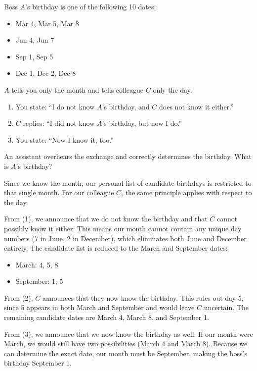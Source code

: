 \newpage

\begin{problem}
Boss $A$'s birthday is one of the following 10 dates:
\begin{itemize}
    \item Mar 4, Mar 5, Mar 8
    \item Jun 4, Jun 7
    \item Sep 1, Sep 5
    \item Dec 1, Dec 2, Dec 8
\end{itemize}
$A$ tells you only the month and tells colleague $C$ only the day.
\begin{enumerate}
    \item You state: ``I do not know $A$'s birthday, and $C$ does not know it either.''
    \item $C$ replies: ``I did not know $A$'s birthday, but now I do.''
    \item You state: ``Now I know it, too.''
\end{enumerate}
An assistant overhears the exchange and correctly determines the birthday. What is $A$'s birthday?
\end{problem}

\begin{solution}
Since we know the month, our personal list of candidate birthdays is restricted to that single month. For our colleague $C$, the same principle applies with respect to the day.

From (1), we announce that we do not know the birthday and that $C$ cannot possibly know it either. This means our month cannot contain any unique day numbers (7 in June, 2 in December), which eliminates both June and December entirely. The candidate list is reduced to the March and September dates:
\begin{itemize}
    \item March: 4, 5, 8
    \item September: 1, 5
\end{itemize}

From (2), $C$ announces that they now know the birthday. This rules out day 5, since 5 appears in both March and September and would leave $C$ uncertain. The remaining candidate dates are March 4, March 8, and September 1.

From (3), we announce that we now know the birthday as well. If our month were March, we would still have two possibilities (March 4 and March 8). Because we can determine the exact date, our month must be September, making the boss's birthday September 1.
\end{solution}

